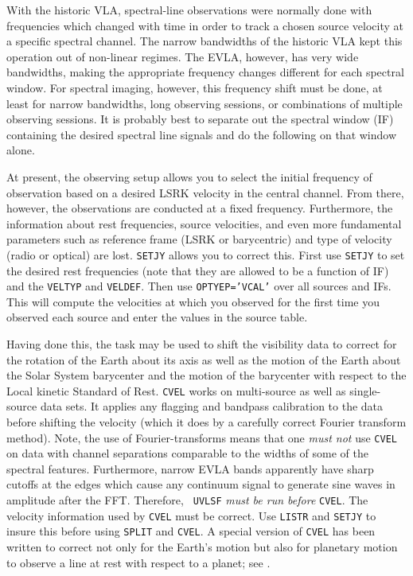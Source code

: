 With the historic VLA, spectral-line observations were normally done
with frequencies which changed with time in order to track a chosen
source velocity at a specific spectral channel.  The narrow bandwidths
of the historic VLA kept this operation out of non-linear regimes.
The EVLA, however, has very wide bandwidths, making the appropriate
frequency changes different for each spectral window.  For spectral
imaging, however, this frequency shift must be done, at least for
narrow bandwidths, long observing sessions, or combinations of
multiple observing sessions.  It is probably best to separate out the
spectral window (IF) containing the desired spectral line signals and
do the following on that window alone.

At present, the  observing setup allows you to select the
initial frequency of observation based on a desired LSRK velocity in
the central channel.  From there, however, the observations are
conducted at a fixed frequency.  Furthermore, the information about
rest frequencies, source velocities, and even more fundamental
parameters such as reference frame (LSRK or barycentric) and type of
velocity (radio or optical) are lost.  {\tt SETJY} allows you to
correct this. First use {\tt SETJY} to set the desired rest
frequencies (note that they are allowed to be a function of IF) and
the {\tt VELTYP} and {\tt VELDEF}\@.  Then use {\tt OPTYEP='VCAL'}
over all sources and IFs.  This will compute the velocities at which
you observed for the first time you observed each source and enter the
values in the source table.

Having done this, the task {\tt {}} may be used to shift
the visibility data to correct for the rotation of the Earth about its
axis as well as the motion of the Earth about the Solar System
barycenter and the motion of the barycenter with respect to the Local
kinetic Standard of Rest.  {\tt CVEL} works on multi-source as well as
single-source data sets.  It applies any flagging and bandpass
calibration to the data before shifting the velocity (which it does by
a carefully correct Fourier transform method).  Note, the use of
Fourier-transforms means that one {\it must not} use {\tt CVEL} on
data with channel separations comparable to the widths of some of the
spectral features.  Furthermore, narrow EVLA bands apparently have
sharp cutoffs at the edges which cause any continuum signal to
generate sine waves in amplitude after the FFT\@.  Therefore, {\tt
UVLSF} {\it must be run before} {\tt CVEL}\@.  The velocity
information used by {\tt CVEL} must be correct.  Use {\tt LISTR} and
{\tt SETJY} to insure this before using {\tt SPLIT} and {\tt CVEL}\@.
A special version of {\tt CVEL} has been written to correct not only
for the Earth's motion but also for planetary motion to observe a line
at rest with respect to a planet; see {\tt {}}\@.

